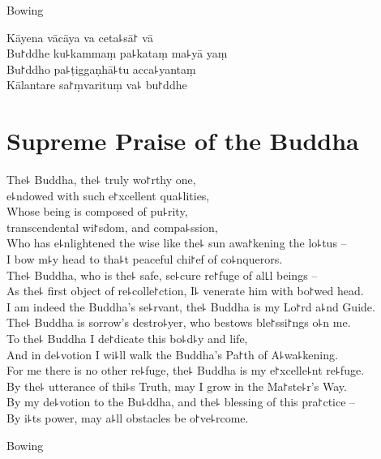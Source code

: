 \begin{instruction}
  Bowing
\end{instruction}

Kāyena vācāya va ceta꜕sā꜓ vā\\
Bu꜓ddhe ku꜕kammaṃ pa꜕kataṃ ma꜕yā yaṃ\\
Bu꜓ddho pa꜕ṭiggaṇhā꜕tu acca꜕yantaṃ\\
Kālantare sa꜓ṃvarituṃ va꜕ bu꜓ddhe

\clearpage

\chapter{Supreme Praise of the Buddha}%

\begin{leader}
\end{leader}

The꜕ Buddha, the꜕ truly wo꜓rthy one,\\
\vin e꜕ndowed with such e꜓xcellent qua꜕lities,\\
Whose being is composed of pu꜕rity,\\
\vin transcendental wi꜓sdom, and compa꜕ssion,\\
Who has e꜕nlightened the wise like the꜕ sun awa꜓kening the lo꜕tus --\\
I bow m꜕y head to tha꜕t peaceful chi꜓ef of co꜕nquerors.\\
The꜕ Buddha, who is the꜕ safe, se꜕cure re꜓fuge of al꜖l beings --\\
As the꜕ first object of re꜕colle꜓ction, I꜕ venerate him with bo꜓wed head.\\
I am indeed the Buddha's se꜕rvant, the꜕ Buddha is my Lo꜓rd a꜕nd Guide.\\
The꜕ Buddha is sorrow's destro꜕yer, who bestows ble꜓ssi꜓ngs o꜕n me.\\
To the꜕ Buddha I de꜓dicate this bo꜕d꜕y and life,\\
And in de꜕votion I wi꜕ll walk the Buddha's Pa꜓th of A꜕wa꜕kening.\\
For me there is no other re꜕fuge, the꜕ Buddha is my e꜓xcelle꜕nt re꜕fuge.\\
By the꜕ utterance of thi꜕s Truth, may I grow in the Ma꜓ste꜕r's Way.\\
By my de꜕votion to the Bu꜕ddha, and the꜕ blessing of this pra꜓ctice --\\
By i꜕ts power, may a꜕ll obstacles be o꜓ve꜕rcome.

\begin{instruction}
  Bowing
\end{instruction}

